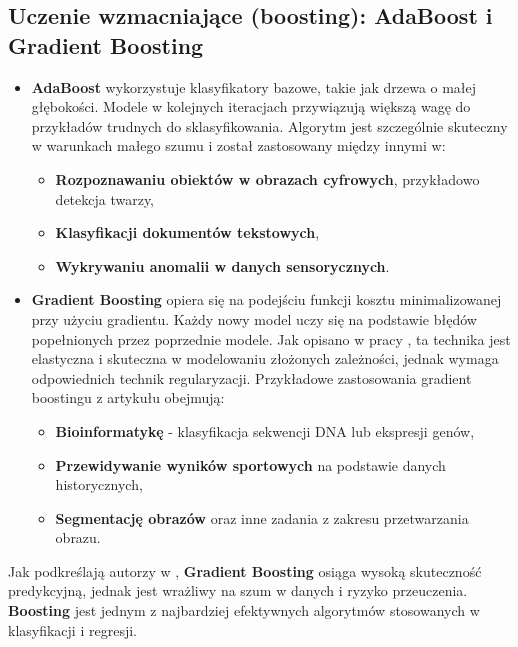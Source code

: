 \subsection{Uczenie wzmacniające (boosting): AdaBoost i Gradient Boosting}
\begin{itemize}
	\item
	      \textbf{AdaBoost} wykorzystuje klasyfikatory bazowe, takie jak drzewa o małej głębokości. Modele w kolejnych iteracjach przywiązują większą wagę do przykładów trudnych do sklasyfikowania. Algorytm jest szczególnie skuteczny w warunkach małego szumu i został zastosowany między innymi w:

	      \begin{itemize}
		      \item
		            \textbf{Rozpoznawaniu obiektów w obrazach cyfrowych}, przykładowo detekcja twarzy,
		      \item
		            \textbf{Klasyfikacji dokumentów tekstowych},
		      \item
		            \textbf{Wykrywaniu anomalii w danych sensorycznych}.
	      \end{itemize}

	\item
	      \textbf{Gradient Boosting} opiera się na podejściu funkcji kosztu minimalizowanej przy użyciu gradientu. Każdy nowy model uczy się na podstawie błędów popełnionych przez poprzednie modele. Jak opisano w pracy \cite{Gradient_boosting}, ta technika jest elastyczna i skuteczna w modelowaniu złożonych zależności, jednak wymaga odpowiednich technik regularyzacji. Przykładowe zastosowania gradient boostingu z artykułu obejmują:

	      \begin{itemize}
		      \item
		            \textbf{Bioinformatykę} - klasyfikacja sekwencji DNA lub ekspresji genów,
		      \item
		            \textbf{Przewidywanie wyników sportowych} na podstawie danych historycznych,
		      \item
		            \textbf{Segmentację obrazów} oraz inne zadania z zakresu przetwarzania obrazu.
	      \end{itemize}
\end{itemize}
Jak podkreślają autorzy w \cite{Gradient_boosting}, \textbf{Gradient Boosting} osiąga wysoką skuteczność predykcyjną, jednak jest wrażliwy na szum w danych i ryzyko przeuczenia. \textbf{Boosting} jest jednym z najbardziej efektywnych algorytmów stosowanych w klasyfikacji i regresji.

